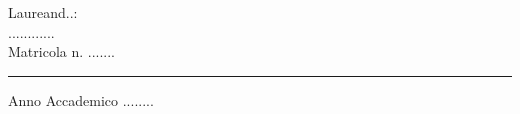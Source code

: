 \begin{titlepage}
    \vspace*{5mm}

    \begin{flushright}
        {\fontsize{17}{17}\selectfont 
            Laureand..:\\
            ............\\
            Matricola n. .......\\
        }

    \end{flushright}

 
    \vspace*{5mm}

    \rule{0.8\textwidth}{0.4pt}
    \begin{center}
    {\fontsize{17}{17}\selectfont 
        Anno Accademico ........
    }
    \end{center}
    
    
\end{titlepage}
\restoregeometry


